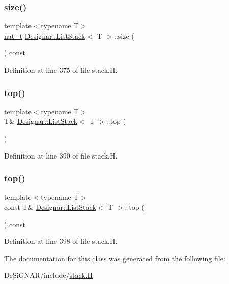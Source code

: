\subsubsection{\texorpdfstring{size()}{size()}}
{\footnotesize\ttfamily template$<$typename T$>$ \\
\hyperlink{namespace_designar_aa72662848b9f4815e7bf31a7cf3e33d1}{nat\+\_\+t} \hyperlink{class_designar_1_1_list_stack}{Designar\+::\+List\+Stack}$<$ T $>$\+::size (\begin{DoxyParamCaption}{ }\end{DoxyParamCaption}) const\hspace{0.3cm}{\ttfamily [inline]}}



Definition at line 375 of file stack.\+H.

\mbox{\label{class_designar_1_1_list_stack_a5b6e47be80da93039d31cd885e97cf34}} 
\subsubsection{\texorpdfstring{top()}{top()}\hspace{0.1cm}{\footnotesize\ttfamily [1/2]}}
{\footnotesize\ttfamily template$<$typename T$>$ \\
T\& \hyperlink{class_designar_1_1_list_stack}{Designar\+::\+List\+Stack}$<$ T $>$\+::top (\begin{DoxyParamCaption}{ }\end{DoxyParamCaption})\hspace{0.3cm}{\ttfamily [inline]}}



Definition at line 390 of file stack.\+H.

\mbox{\label{class_designar_1_1_list_stack_a6eafdfa1a1a43b4cbbe27730a7dcffd3}} 
\subsubsection{\texorpdfstring{top()}{top()}\hspace{0.1cm}{\footnotesize\ttfamily [2/2]}}
{\footnotesize\ttfamily template$<$typename T$>$ \\
const T\& \hyperlink{class_designar_1_1_list_stack}{Designar\+::\+List\+Stack}$<$ T $>$\+::top (\begin{DoxyParamCaption}{ }\end{DoxyParamCaption}) const\hspace{0.3cm}{\ttfamily [inline]}}



Definition at line 398 of file stack.\+H.



The documentation for this class was generated from the following file\+:\begin{DoxyCompactItemize}
\item 
De\+Si\+G\+N\+A\+R/include/\hyperlink{stack_8_h}{stack.\+H}\end{DoxyCompactItemize}
